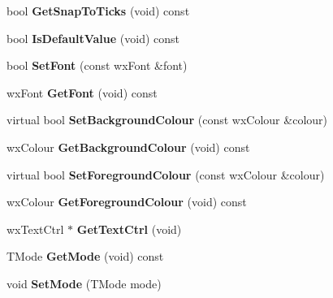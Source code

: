 \begin{DoxyCompactItemize}
\item 
\hypertarget{classwx_spin_ctrl_dbl_a1a49a8001fc743715a1edf9a65ce444e}{bool {\bfseries Get\+Snap\+To\+Ticks} (void) const }\label{classwx_spin_ctrl_dbl_a1a49a8001fc743715a1edf9a65ce444e}

\item 
\hypertarget{classwx_spin_ctrl_dbl_abc633299b04c5646572aa5cdc0c2f526}{bool {\bfseries Is\+Default\+Value} (void) const }\label{classwx_spin_ctrl_dbl_abc633299b04c5646572aa5cdc0c2f526}

\item 
\hypertarget{classwx_spin_ctrl_dbl_a57e8b1e8e94a6951e8871cf465549b40}{bool {\bfseries Set\+Font} (const wx\+Font \&font)}\label{classwx_spin_ctrl_dbl_a57e8b1e8e94a6951e8871cf465549b40}

\item 
\hypertarget{classwx_spin_ctrl_dbl_ac8b53fd7889d2852de1d60a16fc1972b}{wx\+Font {\bfseries Get\+Font} (void) const }\label{classwx_spin_ctrl_dbl_ac8b53fd7889d2852de1d60a16fc1972b}

\item 
\hypertarget{classwx_spin_ctrl_dbl_ae07ab4ae6442383b9acb1cb9ef100602}{virtual bool {\bfseries Set\+Background\+Colour} (const wx\+Colour \&colour)}\label{classwx_spin_ctrl_dbl_ae07ab4ae6442383b9acb1cb9ef100602}

\item 
\hypertarget{classwx_spin_ctrl_dbl_a2bdbe46709a9520e9597129622e55c47}{wx\+Colour {\bfseries Get\+Background\+Colour} (void) const }\label{classwx_spin_ctrl_dbl_a2bdbe46709a9520e9597129622e55c47}

\item 
\hypertarget{classwx_spin_ctrl_dbl_a58917affcb5649bc390dc50c9286df52}{virtual bool {\bfseries Set\+Foreground\+Colour} (const wx\+Colour \&colour)}\label{classwx_spin_ctrl_dbl_a58917affcb5649bc390dc50c9286df52}

\item 
\hypertarget{classwx_spin_ctrl_dbl_aa927ddeeb72a464db5405504be105cfe}{wx\+Colour {\bfseries Get\+Foreground\+Colour} (void) const }\label{classwx_spin_ctrl_dbl_aa927ddeeb72a464db5405504be105cfe}

\item 
\hypertarget{classwx_spin_ctrl_dbl_ae7991de96571c2fcc13af0b69f6209ba}{wx\+Text\+Ctrl $\ast$ {\bfseries Get\+Text\+Ctrl} (void)}\label{classwx_spin_ctrl_dbl_ae7991de96571c2fcc13af0b69f6209ba}

\item 
\hypertarget{classwx_spin_ctrl_dbl_a0e843634add90f0c37fd66657a4217e3}{T\+Mode {\bfseries Get\+Mode} (void) const }\label{classwx_spin_ctrl_dbl_a0e843634add90f0c37fd66657a4217e3}

\item 
\hypertarget{classwx_spin_ctrl_dbl_a812f615c90c378ecd4c8265b9af72f57}{void {\bfseries Set\+Mode} (T\+Mode mode)}\label{classwx_spin_ctrl_dbl_a812f615c90c378ecd4c8265b9af72f57}

\end{DoxyCompactItemize}
